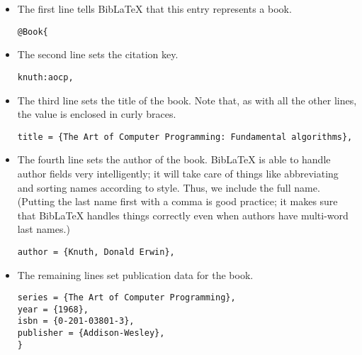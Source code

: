 \documentclass{article}
\begin{document}
\begin{itemize}
\item
  The first line tells Bib\LaTeX{} that this entry represents a book.
\begin{verbatim}
@Book{
\end{verbatim}

\item
  The second line sets the citation key.
\begin{verbatim}
knuth:aocp,
\end{verbatim}

\item
  The third line sets the title of the book.
  Note that, as with all the other lines, the value is enclosed in curly braces.
\begin{verbatim}
title = {The Art of Computer Programming: Fundamental algorithms},
\end{verbatim}

\item
  The fourth line sets the author of the book.
  Bib\LaTeX{} is able to handle author fields very intelligently; it will take care of things like abbreviating and sorting names according to style.
  Thus, we include the full name.
  (Putting the last name first with a comma is good practice; it makes sure that Bib\LaTeX{} handles things correctly even when authors have multi-word last names.)
\begin{verbatim}
author = {Knuth, Donald Erwin},
\end{verbatim}

\item
  The remaining lines set publication data for the book.
\begin{verbatim}
series = {The Art of Computer Programming},
year = {1968},
isbn = {0-201-03801-3},
publisher = {Addison-Wesley},
}
\end{verbatim}
\end{itemize}
\end{document}

